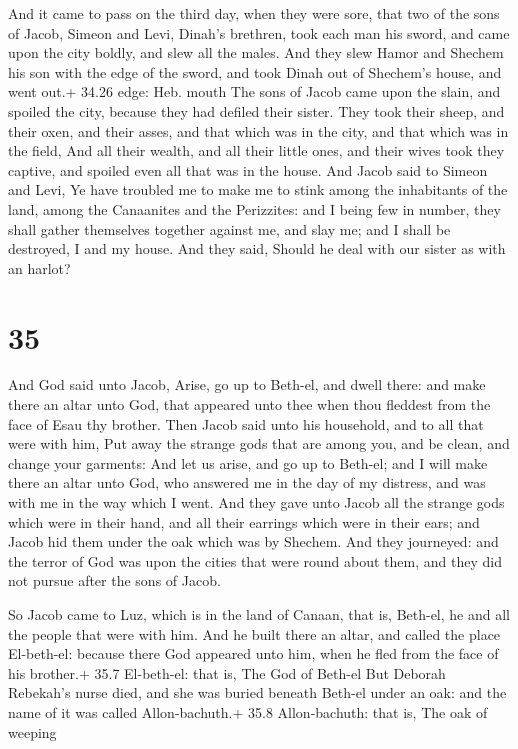  And it came to pass on the third day, when they were
sore, that two of the sons of Jacob, Simeon and Levi, Dinah's brethren,
took each man his sword, and came upon the city boldly, and slew all the
males.  And they slew Hamor and Shechem his son with the
edge of the sword, and took Dinah out of Shechem's house, and went out.+
34.26 edge: Heb. mouth  The sons of Jacob came upon the
slain, and spoiled the city, because they had defiled their sister.
 They took their sheep, and their oxen, and their asses,
and that which was in the city, and that which was in the field,
 And all their wealth, and all their little ones, and their
wives took they captive, and spoiled even all that was in the house.
 And Jacob said to Simeon and Levi, Ye have troubled me to
make me to stink among the inhabitants of the land, among the Canaanites
and the Perizzites: and I being few in number, they shall gather
themselves together against me, and slay me; and I shall be destroyed, I
and my house.  And they said, Should he deal with our
sister as with an harlot?

\hypertarget{section-34}{%
\section{35}\label{section-34}}

 And God said unto Jacob, Arise, go up to Beth-el, and dwell
there: and make there an altar unto God, that appeared unto thee when
thou fleddest from the face of Esau thy brother.  Then Jacob
said unto his household, and to all that were with him, Put away the
strange gods that are among you, and be clean, and change your garments:
 And let us arise, and go up to Beth-el; and I will make
there an altar unto God, who answered me in the day of my distress, and
was with me in the way which I went.  And they gave unto
Jacob all the strange gods which were in their hand, and all their
earrings which were in their ears; and Jacob hid them under the oak
which was by Shechem.  And they journeyed: and the terror of
God was upon the cities that were round about them, and they did not
pursue after the sons of Jacob.

 So Jacob came to Luz, which is in the land of Canaan,
that is, Beth-el, he and all the people that were with him. 
And he built there an altar, and called the place El-beth-el: because
there God appeared unto him, when he fled from the face of his brother.+
35.7 El-beth-el: that is, The God of Beth-el  But Deborah
Rebekah's nurse died, and she was buried beneath Beth-el under an oak:
and the name of it was called Allon-bachuth.+ 35.8 Allon-bachuth: that
is, The oak of weeping

